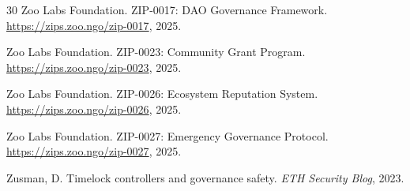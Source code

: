 \documentclass[11pt,letterpaper]{article}
\begin{document}
\begin{thebibliography}{30}
Zoo Labs Foundation.
\newblock ZIP-0017: DAO Governance Framework.
\newblock \url{https://zips.zoo.ngo/zip-0017}, 2025.

Zoo Labs Foundation.
\newblock ZIP-0023: Community Grant Program.
\newblock \url{https://zips.zoo.ngo/zip-0023}, 2025.

Zoo Labs Foundation.
\newblock ZIP-0026: Ecosystem Reputation System.
\newblock \url{https://zips.zoo.ngo/zip-0026}, 2025.

Zoo Labs Foundation.
\newblock ZIP-0027: Emergency Governance Protocol.
\newblock \url{https://zips.zoo.ngo/zip-0027}, 2025.

Zusman, D.
\newblock Timelock controllers and governance safety.
\newblock \emph{ETH Security Blog}, 2023.

\end{thebibliography}
\end{document}

